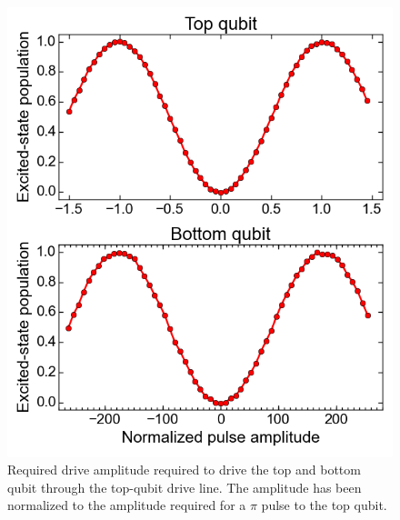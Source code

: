       \begin{figure}
        \begin{center}
        \vspace{-30pt}
          \includegraphics[width=\textwidth]{Figures/Exploring frequency re-use/cross-driving_Rabi.png}
        \end{center}
        \vspace{-20 pt}
        \caption{Required drive amplitude required to drive the top and bottom qubit through the top-qubit drive line. The amplitude has been normalized to the amplitude required for a $\pi$ pulse to the top qubit.}
        \label{fig:cross-driving Rabi}
      \end{figure}


